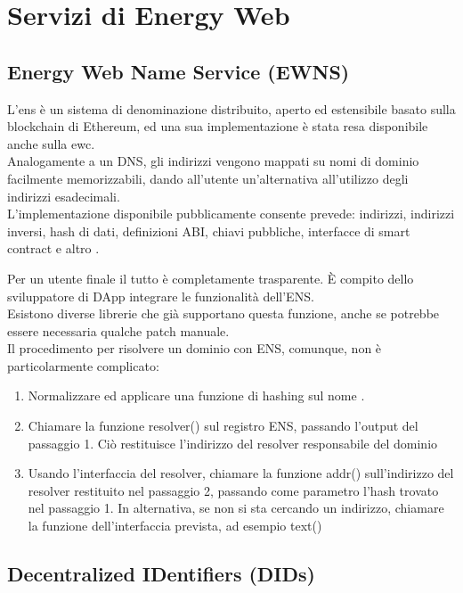 \chapter{Servizi di Energy Web}

\section{Energy Web Name Service (EWNS)}
\label{sec:ewns}

L'\gls{ens} è un sistema di denominazione distribuito, aperto ed estensibile basato sulla blockchain di Ethereum, ed una sua implementazione è stata resa disponibile anche sulla \gls{ewc}. \\
Analogamente a un DNS, gli indirizzi vengono mappati su nomi di dominio facilmente memorizzabili, dando all'utente un'alternativa all'utilizzo degli indirizzi esadecimali. \\
L'implementazione disponibile pubblicamente consente prevede: indirizzi, indirizzi inversi, hash di dati, definizioni ABI, chiavi pubbliche, interfacce di smart contract e altro \cite{wiki:ewns}.

Per un utente finale il tutto è completamente trasparente. 
È compito dello sviluppatore di DApp integrare le funzionalità dell'ENS. \\
Esistono diverse librerie che già supportano questa funzione, anche se potrebbe essere necessaria qualche patch manuale. \\
Il procedimento per risolvere un dominio con ENS, comunque, non è particolarmente complicato:

\begin{enumerate}
    \item Normalizzare ed applicare una funzione di hashing sul nome \cite{wiki:ens-normalize-name}.
    \item Chiamare la funzione resolver() sul registro ENS, passando l'output del passaggio 1. Ciò restituisce l'indirizzo del resolver responsabile del dominio
    \item Usando l'interfaccia del resolver, chiamare la funzione addr() sull'indirizzo del resolver restituito nel passaggio 2, passando come parametro l'hash trovato nel passaggio 1. In alternativa, se non si sta cercando un indirizzo, chiamare la funzione dell'interfaccia prevista, ad esempio text()
\end{enumerate}

\section{Decentralized IDentifiers (DIDs)}
\label{sec:did}

